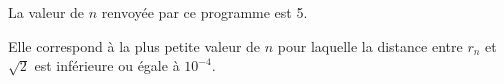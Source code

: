 \documentclass[10pt]{article}
\begin{document}
\begin{enumerate}
\begin{enumerate}
La valeur de $n$ renvoyée par ce programme est 5.



Elle correspond à  la plus petite valeur de $n$ pour laquelle la distance entre $r_n$ et $\sqrt{2}$ est inférieure ou égale à  $10^{-4}$.

	\end{enumerate}
\end{enumerate}

\bigskip
\end{document}
